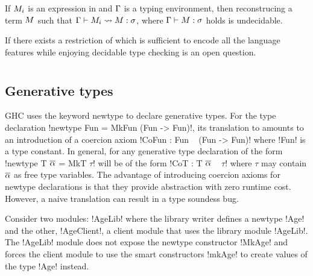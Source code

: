 \documentclass[manuscript,screen,nonacm]{acmart}
\begin{document}
\begin{theorem}
  If $M_i$ is an expression in \SFCi and $\Gamma$ is a typing environment, then reconstrucing a \SFC term $M$ such that $\Gamma \vdash M_i \rightsquigarrow M : \sigma$, where $\Gamma \vdash M : \sigma$ holds is undecidable.
\end{theorem}

If there exists a restriction of \SFCi which is sufficient to encode all the language features while enjoying decidable type checking is an open question.


\section{\SFR}\label{sec:sfr} %
\subsection{Generative types}
GHC uses the keyword newtype to declare generative types. For the type declaration !newtype Fun = MkFun (Fun -> Fun)!, its translation to \SFC amounts to an introduction of a coercion axiom !CoFun : Fun ~ (Fun -> Fun)! where !Fun! is a type constant. In general, for any generative type declaration of the form !newtype T $\overline{\alpha}$ = MkT $\tau$! will be of the form !CoT : T $\overline{\alpha}$ ~ $\tau$! where $\tau$ may contain $\overline{\alpha}$ as free type variables. The advantage of introducing coercion axioms for newtype declarations is that they provide abstraction with zero runtime cost. However,
a naive translation can result in a type soundess bug\cite{TODO}.

Consider two modules: !AgeLib! where the library writer defines a newtype !Age! and the other, !AgeClient!, a client module that uses the library module !AgeLib!. The !AgeLib! module does not expose the newtype constructor !MkAge! and forces the client module to use the smart constructors !mkAge! to create values of the type !Age! instead.
\end{document}

